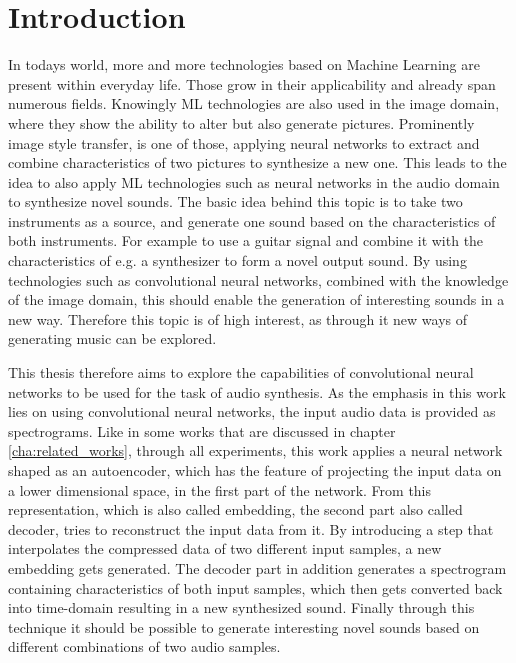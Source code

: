 \chapter{Introduction}
\label{cha:Introduction}

In todays world, more and more technologies based on Machine Learning are present within everyday life. Those grow in their applicability and already span numerous fields. Knowingly ML technologies are also used in the image domain, where they show the ability to alter but also generate pictures. Prominently image style transfer, is one of those, applying neural networks to extract and combine characteristics of two pictures to synthesize a new one. This leads to the idea to also apply ML technologies such as neural networks in the audio domain to synthesize novel sounds. The basic idea behind this topic is to take two instruments as a source, and generate one sound based on the characteristics of both instruments. For example to use a guitar signal and combine it with the characteristics of e.g. a synthesizer to form a novel output sound. By using technologies such as convolutional neural networks, combined with the knowledge of the image domain, this should enable the generation of interesting sounds in a new way. Therefore this topic is of high interest, as through it new ways of generating music can be explored. 

This thesis therefore aims to explore the capabilities of convolutional neural networks to be used for the task of audio synthesis. As the emphasis in this work lies on using convolutional neural networks, the input audio data is provided as spectrograms. Like in some works that are discussed in chapter \ref{cha:related_works}, through all experiments, this work applies a neural network shaped as an autoencoder, which has the feature of projecting the input data on a lower dimensional space, in the first part of the network. From this representation, which is also called embedding, the second part also called decoder, tries to reconstruct the input data from it. By introducing a step that interpolates the compressed data of two different input samples, a new embedding gets generated. The decoder part in addition generates a spectrogram containing characteristics of both input samples, which then gets converted back into time-domain resulting in a new synthesized sound. Finally through this technique it should be possible to generate interesting novel sounds based on different combinations of two audio samples.

